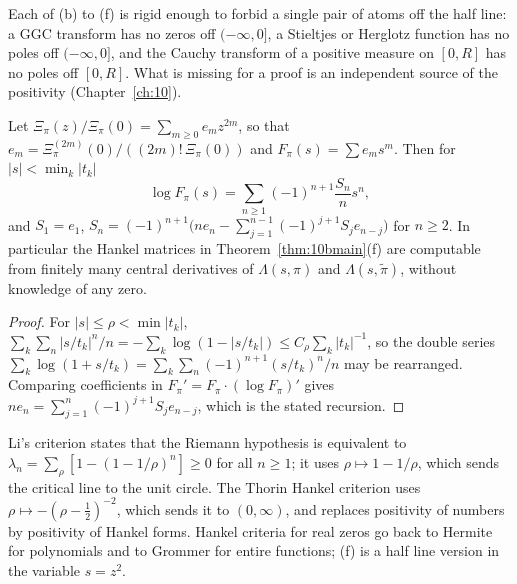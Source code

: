 Each of (b) to (f) is rigid enough to forbid a single pair of atoms off the half line: a GGC transform has no zeros off $(-\infty,0]$, a Stieltjes or Herglotz function has no poles off $(-\infty,0]$, and the Cauchy transform of a positive measure on $[0,R]$ has no poles off $[0,R]$. What is missing for a proof is an independent source of the positivity (Chapter~\ref{ch:10}).

\begin{corollary}\label{cor:10bnewton}
Let $\Xi_\pi(z)/\Xi_\pi(0) = \sum_{m\ge0}e_mz^{2m}$, so that $e_m = \Xi_\pi^{(2m)}(0)/((2m)!\,\Xi_\pi(0))$ and $F_\pi(s) = \sum e_ms^m$. Then for $|s|<\min_k|t_k|$
\[
\log F_\pi(s) = \sum_{n\ge1}(-1)^{n+1}\frac{S_n}{n}s^n,
\]
and $S_1 = e_1$, $S_n = (-1)^{n+1}\bigl(ne_n-\sum_{j=1}^{n-1}(-1)^{j+1}S_je_{n-j}\bigr)$ for $n\ge2$. In particular the Hankel matrices in Theorem~\ref{thm:10bmain}(f) are computable from finitely many central derivatives of $\Lambda(s,\pi)$ and $\Lambda(s,\tilde\pi)$, without knowledge of any zero.
\end{corollary}

\begin{proof}
For $|s|\le\rho<\min|t_k|$, $\sum_k\sum_n|s/t_k|^n/n = -\sum_k\log(1-|s/t_k|)\le C_\rho\sum_k|t_k|^{-1}$, so the double series $\sum_k\log(1+s/t_k) = \sum_k\sum_n(-1)^{n+1}(s/t_k)^n/n$ may be rearranged. Comparing coefficients in $F_\pi' = F_\pi\cdot(\log F_\pi)'$ gives $ne_n = \sum_{j=1}^n(-1)^{j+1}S_je_{n-j}$, which is the stated recursion.
\end{proof}

\begin{remark}
Li's criterion \cite{li1997} states that the Riemann hypothesis is equivalent to $\lambda_n = \sum_\rho[1-(1-1/\rho)^n]\ge0$ for all $n\ge1$; it uses $\rho\mapsto1-1/\rho$, which sends the critical line to the unit circle. The Thorin Hankel criterion uses $\rho\mapsto-(\rho-\frac12)^{-2}$, which sends it to $(0,\infty)$, and replaces positivity of numbers by positivity of Hankel forms. Hankel criteria for real zeros go back to Hermite for polynomials and to Grommer \cite{grommer1914} for entire functions; (f) is a half line version in the variable $s = z^2$.
\end{remark}

